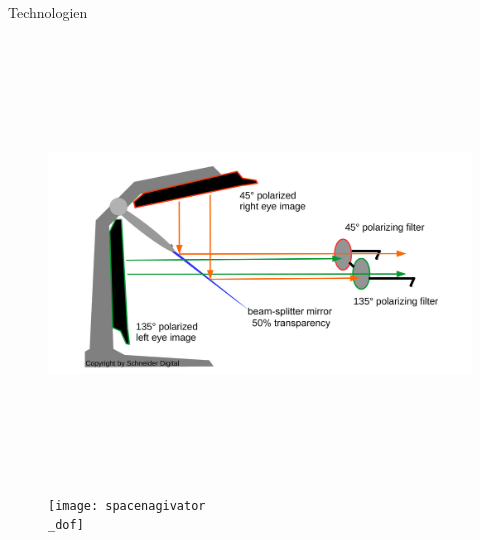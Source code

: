 \documentclass[final,hyperref={pdfpagelabels=false}]{beamer}
\begin{document}
\begin{frame}[t]
\begin{columns}[t]
\begin{column}{.465\textwidth}
\begin{block}{Technologien}
   \begin{figure}
       \includegraphics[height=12cm]{pluraviewTechnologie}
       \texttt{[image: spacenagivator\\\_dof]}
   \end{figure}
   
   
     
   
   
\end{block}


\vspace{0.125cm}


\end{column}
\end{columns}
\end{frame}
\end{document}
